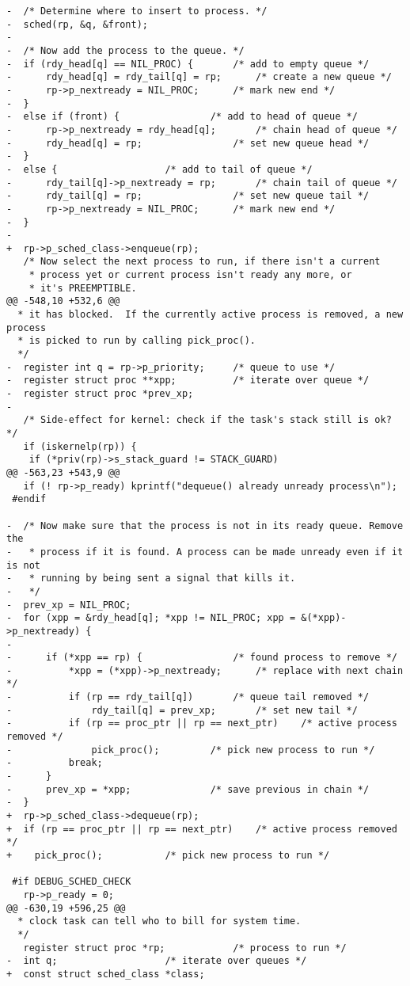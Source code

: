 \begin{verbatim}
-  /* Determine where to insert to process. */
-  sched(rp, &q, &front);
-
-  /* Now add the process to the queue. */
-  if (rdy_head[q] == NIL_PROC) {		/* add to empty queue */
-      rdy_head[q] = rdy_tail[q] = rp; 		/* create a new queue */
-      rp->p_nextready = NIL_PROC;		/* mark new end */
-  } 
-  else if (front) {				/* add to head of queue */
-      rp->p_nextready = rdy_head[q];		/* chain head of queue */
-      rdy_head[q] = rp;				/* set new queue head */
-  } 
-  else {					/* add to tail of queue */
-      rdy_tail[q]->p_nextready = rp;		/* chain tail of queue */	
-      rdy_tail[q] = rp;				/* set new queue tail */
-      rp->p_nextready = NIL_PROC;		/* mark new end */
-  }
-
+  rp->p_sched_class->enqueue(rp);
   /* Now select the next process to run, if there isn't a current
    * process yet or current process isn't ready any more, or
    * it's PREEMPTIBLE.
@@ -548,10 +532,6 @@
  * it has blocked.  If the currently active process is removed, a new process
  * is picked to run by calling pick_proc().
  */
-  register int q = rp->p_priority;		/* queue to use */
-  register struct proc **xpp;			/* iterate over queue */
-  register struct proc *prev_xp;
-
   /* Side-effect for kernel: check if the task's stack still is ok? */
   if (iskernelp(rp)) { 				
 	if (*priv(rp)->s_stack_guard != STACK_GUARD)
@@ -563,23 +543,9 @@
   if (! rp->p_ready) kprintf("dequeue() already unready process\n");
 #endif
 
-  /* Now make sure that the process is not in its ready queue. Remove the 
-   * process if it is found. A process can be made unready even if it is not 
-   * running by being sent a signal that kills it.
-   */
-  prev_xp = NIL_PROC;				
-  for (xpp = &rdy_head[q]; *xpp != NIL_PROC; xpp = &(*xpp)->p_nextready) {
-
-      if (*xpp == rp) {				/* found process to remove */
-          *xpp = (*xpp)->p_nextready;		/* replace with next chain */
-          if (rp == rdy_tail[q])		/* queue tail removed */
-              rdy_tail[q] = prev_xp;		/* set new tail */
-          if (rp == proc_ptr || rp == next_ptr)	/* active process removed */
-              pick_proc();			/* pick new process to run */
-          break;
-      }
-      prev_xp = *xpp;				/* save previous in chain */
-  }
+  rp->p_sched_class->dequeue(rp);
+  if (rp == proc_ptr || rp == next_ptr)	/* active process removed */
+    pick_proc();			/* pick new process to run */
 
 #if DEBUG_SCHED_CHECK
   rp->p_ready = 0;
@@ -630,19 +596,25 @@
  * clock task can tell who to bill for system time.
  */
   register struct proc *rp;			/* process to run */
-  int q;					/* iterate over queues */
+  const struct sched_class *class;
 

\end{verbatim}
